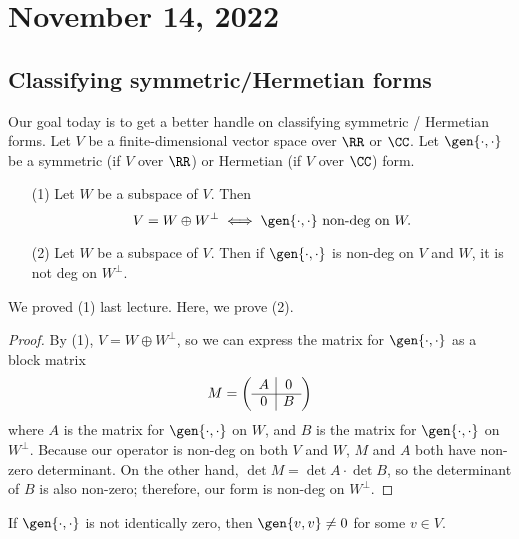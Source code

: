\section{November 14, 2022}

\subsection{Classifying symmetric/Hermetian forms}

Our goal today is to get a better handle on classifying symmetric / Hermetian forms. Let $V$ be a finite-dimensional vector space over $\RR$ or $\CC$. Let $\gen{\cdot, \cdot}$ be a symmetric (if $V$ over $\RR$) or Hermetian (if $V$ over $\CC$) form. 

\begin{theorem}
\thmlabel

\begin{enumerate}
    \item [(1)] Let $W$ be a subspace of $V$. Then 
\[V = W\oplus W^{\perp}\iff \gen{\cdot, \cdot}\text{ non-deg on }W.\]
    \item [(2)] Let $W$ be a subspace of $V$. Then if $\gen{\cdot, \cdot}$ is non-deg on $V$ and $W$, it is not deg on $W^{\perp}$. 
\end{enumerate}
\end{theorem}

We proved (1) last lecture. Here, we prove (2). 

\begin{proof}
By (1), $V = W\oplus W^{\perp}$, so we can express the matrix for $\gen{\cdot, \cdot}$ as a block matrix
\[M = \left(
    \begin{array}{cc}
      \multicolumn{1}{c|}{A} & 0 \\ \cline{1-2}
      \multicolumn{1}{c|}{0} & B \\
    \end{array}
    \right)\]
where $A$ is the matrix for $\gen{\cdot, \cdot}$ on $W$, and $B$ is the matrix for $\gen{\cdot, \cdot}$ on $W^{\perp}$. Because our operator is non-deg on both $V$ and $W$, $M$ and $A$ both have non-zero determinant. On the other hand, $\det M = \det A\cdot \det B$, so the determinant of $B$ is also non-zero; therefore, our form is non-deg on $W^{\perp}$.
\end{proof}

\begin{theorem}
\lemlabel

If $\gen{\cdot, \cdot}$ is not identically zero, then $\gen{v,v}\neq 0$ for some $v\in V$. 
\end{theorem}

